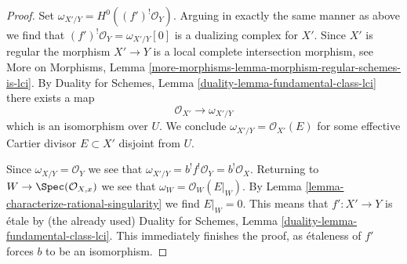 \begin{proof}
\medskip\noindent
Set $\omega_{X'/Y} = H^0((f')^!\mathcal{O}_Y)$. Arguing in exactly the
same manner as above we find that $(f')^!\mathcal{O}_Y = \omega_{X'/Y}[0]$
is a dualizing complex for $X'$. Since $X'$ is regular
the morphism $X' \to Y$ is a local complete intersection morphism, see
More on Morphisms, Lemma
\ref{more-morphisms-lemma-morphism-regular-schemes-is-lci}.
By Duality for Schemes, Lemma \ref{duality-lemma-fundamental-class-lci}
there exists a map
$$
\mathcal{O}_{X'} \longrightarrow \omega_{X'/Y}
$$
which is an isomorphism over $U$. We conclude
$\omega_{X'/Y} = \mathcal{O}_{X'}(E)$ for some effective
Cartier divisor $E \subset X'$ disjoint from $U$.

\medskip\noindent
Since $\omega_{X/Y} = \mathcal{O}_Y$ we see that
$\omega_{X'/Y} = b^! f^!\mathcal{O}_Y = b^!\mathcal{O}_X$.
Returning to $W \to \Spec(\mathcal{O}_{X, x})$
we see that $\omega_W = \mathcal{O}_W(E|_W)$.
By Lemma \ref{lemma-characterize-rational-singularity}
we find $E|_W = 0$.
This means that $f' : X' \to Y$ is \'etale by (the already used)
Duality for Schemes, Lemma \ref{duality-lemma-fundamental-class-lci}.
This immediately finishes the proof, as \'etaleness
of $f'$ forces $b$ to be an isomorphism.
\end{proof}
